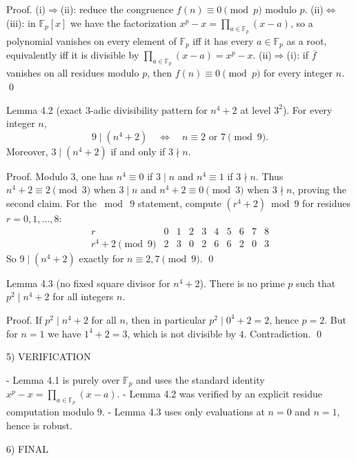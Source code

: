 Proof.
(i)$\Rightarrow$(ii): reduce the congruence $f(n)\equiv 0\pmod p$ modulo $p$.
(ii)$\Leftrightarrow$(iii): in $\mathbb F_p[x]$ we have the factorization
$x^p-x=\prod_{a\in\mathbb F_p}(x-a)$, so a polynomial vanishes on every element of $\mathbb F_p$ iff it has every $a\in\mathbb F_p$ as a root, equivalently iff it is divisible by $\prod_{a\in\mathbb F_p}(x-a)=x^p-x$.
(ii)$\Rightarrow$(i): if $\overline f$ vanishes on all residues modulo $p$, then $f(n)\equiv 0\pmod p$ for every integer $n$. \qed

Lemma 4.2 (exact $3$-adic divisibility pattern for $n^4+2$ at level $3^2$).
For every integer $n$,
\[
9\mid (n^4+2)\quad\Longleftrightarrow\quad n\equiv 2\text{ or }7\pmod 9.
\]
Moreover, $3\mid(n^4+2)$ if and only if $3\nmid n$.

Proof.
Modulo $3$, one has $n^4\equiv 0$ if $3\mid n$ and $n^4\equiv 1$ if $3\nmid n$.
Thus $n^4+2\equiv 2\pmod 3$ when $3\mid n$ and $n^4+2\equiv 0\pmod 3$ when $3\nmid n$, proving the second claim.
For the $\bmod\ 9$ statement, compute $(r^4+2)\bmod 9$ for residues $r=0,1,\dots,8$:
\[
\begin{array}{c|ccccccccc}
 r & 0&1&2&3&4&5&6&7&8\\\hline
 r^4+2\pmod 9 & 2&3&0&2&6&6&2&0&3
\end{array}
\]
So $9\mid (n^4+2)$ exactly for $n\equiv 2,7\pmod 9$. \qed

Lemma 4.3 (no fixed square divisor for $n^4+2$).
There is no prime $p$ such that $p^2\mid n^4+2$ for all integers $n$.

Proof.
If $p^2\mid n^4+2$ for all $n$, then in particular $p^2\mid 0^4+2=2$, hence $p=2$.
But for $n=1$ we have $1^4+2=3$, which is not divisible by $4$. Contradiction. \qed

5) VERIFICATION

- Lemma 4.1 is purely over $\mathbb F_p$ and uses the standard identity $x^p-x=\prod_{a\in\mathbb F_p}(x-a)$.
- Lemma 4.2 was verified by an explicit residue computation modulo $9$.
- Lemma 4.3 uses only evaluations at $n=0$ and $n=1$, hence is robust.

6) FINAL

